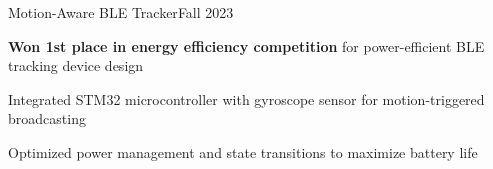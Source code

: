 \begin{joblong}{Motion-Aware BLE Tracker}{Fall 2023}
	\item \textbf{Won 1st place in energy efficiency competition} for power-efficient BLE tracking device design
	\item Integrated STM32 microcontroller with gyroscope sensor for motion-triggered broadcasting
	\item Optimized power management and state transitions to maximize battery life
\end{joblong}
